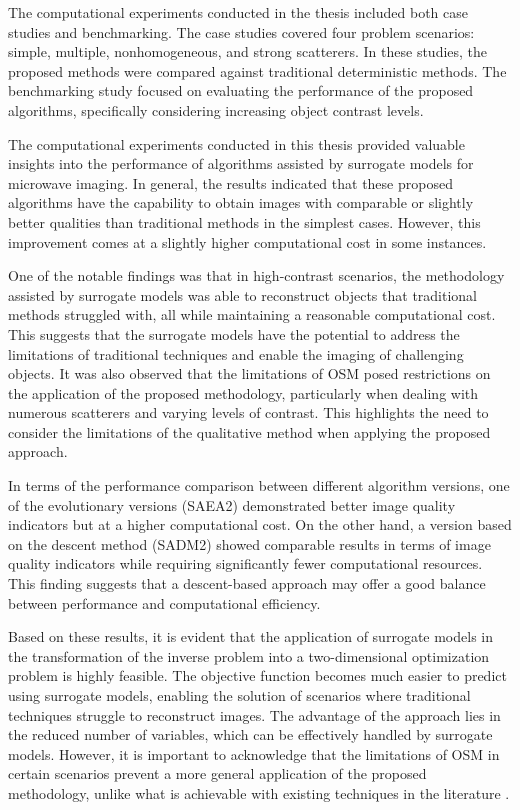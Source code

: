 		The computational experiments conducted in the thesis included both case studies and benchmarking. The case studies covered four problem scenarios: simple, multiple, nonhomogeneous, and strong scatterers. In these studies, the proposed methods were compared against traditional deterministic methods. The benchmarking study focused on evaluating the performance of the proposed algorithms, specifically considering increasing object contrast levels.
		
		The computational experiments conducted in this thesis provided valuable insights into the performance of algorithms assisted by surrogate models for microwave imaging. In general, the results indicated that these proposed algorithms have the capability to obtain images with comparable or slightly better qualities than traditional methods in the simplest cases. However, this improvement comes at a slightly higher computational cost in some instances.
		
		One of the notable findings was that in high-contrast scenarios, the methodology assisted by surrogate models was able to reconstruct objects that traditional methods struggled with, all while maintaining a reasonable computational cost. This suggests that the surrogate models have the potential to address the limitations of traditional techniques and enable the imaging of challenging objects. It was also observed that the limitations of OSM posed restrictions on the application of the proposed methodology, particularly when dealing with numerous scatterers and varying levels of contrast. This highlights the need to consider the limitations of the qualitative method when applying the proposed approach.
		
		In terms of the performance comparison between different algorithm versions, one of the evolutionary versions (SAEA2) demonstrated better image quality indicators but at a higher computational cost. On the other hand, a version based on the descent method (SADM2) showed comparable results in terms of image quality indicators while requiring significantly fewer computational resources. This finding suggests that a descent-based approach may offer a good balance between performance and computational efficiency.
		
		Based on these results, it is evident that the application of surrogate models in the transformation of the inverse problem into a two-dimensional optimization problem is highly feasible. The objective function becomes much easier to predict using surrogate models, enabling the solution of scenarios where traditional techniques struggle to reconstruct images. The advantage of the approach lies in the reduced number of variables, which can be effectively handled by surrogate models. However, it is important to acknowledge that the limitations of OSM in certain scenarios prevent a more general application of the proposed methodology, unlike what is achievable with existing techniques in the literature \citep{salucci2022learned}.
		
